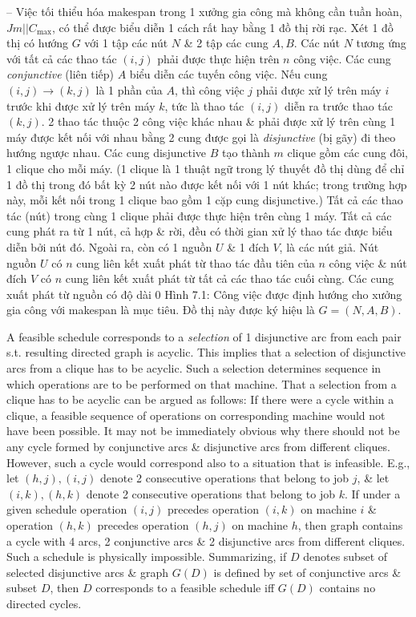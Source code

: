 \documentclass{article}
\begin{document}
\begin{itemize}
\begin{itemize}
        -- Việc tối thiểu hóa makespan trong 1 xưởng gia công mà không cần tuần hoàn, $Jm||C_{\max}$, có thể được biểu diễn 1 cách rất hay bằng 1 đồ thị rời rạc. Xét 1 đồ thị có hướng $G$ với 1 tập các nút $N$ \& 2 tập các cung $A,B$. Các nút $N$ tương ứng với tất cả các thao tác $(i,j)$ phải được thực hiện trên $n$ công việc. Các cung {\it conjunctive} (liên tiếp) $A$ biểu diễn các tuyến công việc. Nếu cung $(i,j)\to(k,j)$ là 1 phần của $A$, thì công việc $j$ phải được xử lý trên máy $i$ trước khi được xử lý trên máy $k$, tức là thao tác $(i,j)$ diễn ra trước thao tác $(k,j)$. 2 thao tác thuộc 2 công việc khác nhau \& phải được xử lý trên cùng 1 máy được kết nối với nhau bằng 2 cung được gọi là {\it disjunctive} (bị gãy) đi theo hướng ngược nhau. Các cung disjunctive $B$ tạo thành $m$ clique gồm các cung đôi, 1 clique cho mỗi máy. (1 clique là 1 thuật ngữ trong lý thuyết đồ thị dùng để chỉ 1 đồ thị trong đó bất kỳ 2 nút nào được kết nối với 1 nút khác; trong trường hợp này, mỗi kết nối trong 1 clique bao gồm 1 cặp cung disjunctive.) Tất cả các thao tác (nút) trong cùng 1 clique phải được thực hiện trên cùng 1 máy. Tất cả các cung phát ra từ 1 nút, cả hợp \& rời, đều có thời gian xử lý thao tác được biểu diễn bởi nút đó. Ngoài ra, còn có 1 nguồn $U$ \& 1 đích $V$, là các nút giả. Nút nguồn $U$ có $n$ cung liên kết xuất phát từ thao tác đầu tiên của $n$ công việc \& nút đích $V$ có $n$ cung liên kết xuất phát từ tất cả các thao tác cuối cùng. Các cung xuất phát từ nguồn có độ dài 0 {\sf Hình 7.1: Công việc được định hướng cho xưởng gia công với makespan là mục tiêu}. Đồ thị này được ký hiệu là $G = (N,A,B)$.

        A feasible schedule corresponds to a {\it selection} of 1 disjunctive arc from each pair s.t. resulting directed graph is acyclic. This implies that a selection of disjunctive arcs from a clique has to be acyclic. Such a selection determines sequence in which operations are to be performed on that machine. That a selection from a clique has to be acyclic can be argued as follows: If there were a cycle within a clique, a feasible sequence of operations on corresponding machine would not have been possible. It may not be immediately obvious why there should not be any cycle formed by conjunctive arcs \& disjunctive arcs from different cliques. However, such a cycle would correspond also to a situation that is infeasible. E.g., let $(h,j),(i,j)$ denote 2 consecutive operations that belong to job $j$, \& let $(i,k),(h,k)$ denote 2 consecutive operations that belong to job $k$. If under a given schedule operation $(i,j)$ precedes operation $(i,k)$ on machine $i$ \& operation $(h,k)$ precedes operation $(h,j)$ on machine $h$, then graph contains a cycle with 4 arcs, 2 conjunctive arcs \& 2 disjunctive arcs from different cliques. Such a schedule is physically impossible. Summarizing, if $D$ denotes subset of selected disjunctive arcs \& graph $G(D)$ is defined by set of conjunctive arcs \& subset $D$, then $D$ corresponds to a feasible schedule iff $G(D)$ contains no directed cycles.


\end{itemize}
\end{itemize}
\end{document}
